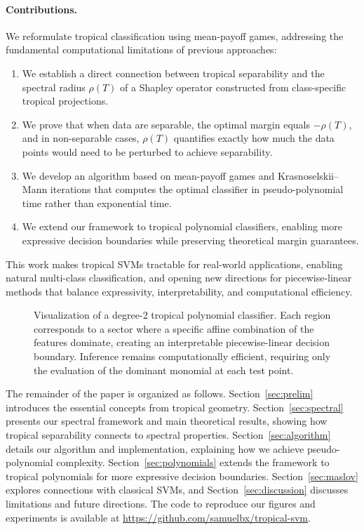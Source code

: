\documentclass{article}
\begin{document}
\paragraph{Contributions.} We reformulate tropical classification using mean-payoff games, addressing the fundamental computational limitations of previous approaches:

\begin{enumerate}
    \item We establish a direct connection between tropical separability and the spectral radius $\rho(T)$ of a Shapley operator constructed from class-specific tropical projections.
    
    \item We prove that when data are separable, the optimal margin equals $-\rho(T)$, and in non-separable cases, $\rho(T)$ quantifies exactly how much the data points would need to be perturbed to achieve separability.
    
    \item We develop an algorithm based on mean-payoff games and Krasnoselskii--Mann iterations that computes the optimal classifier in pseudo-polynomial time rather than exponential time.
    
    \item We extend our framework to tropical polynomial classifiers, enabling more expressive decision boundaries while preserving theoretical margin guarantees.
\end{enumerate}

This work makes tropical SVMs tractable for real-world applications, enabling natural multi-class classification, and opening new directions for piecewise-linear methods that balance expressivity, interpretability, and computational efficiency.

\begin{figure}[h]
    \centering
    \resizebox{0.99\textwidth}{!}{\clipbox{0.15\width{} 0.30\height{} 0.15\width{} 0.30\height{}}{}}
    \caption{Visualization of a degree-2 tropical polynomial classifier. Each region corresponds to a sector where a specific affine combination of the features dominate, creating an interpretable piecewise-linear decision boundary. Inference remains computationally efficient, requiring only the evaluation of the dominant monomial at each test point.}
    \label{fig:tropical_hyperplane}
\end{figure}

The remainder of the paper is organized as follows. Section~\ref{sec:prelim} introduces the essential concepts from tropical geometry. Section~\ref{sec:spectral} presents our spectral framework and main theoretical results, showing how tropical separability connects to spectral properties. Section~\ref{sec:algorithm} details our algorithm and implementation, explaining how we achieve pseudo-polynomial complexity. Section~\ref{sec:polynomials} extends the framework to tropical polynomials for more expressive decision boundaries. Section~\ref{sec:maslov} explores connections with classical SVMs, and Section~\ref{sec:discussion} discusses limitations and future directions. The code to reproduce our figures and experiments is available at \url{https://github.com/samuelbx/tropical-svm}.
\end{document}
